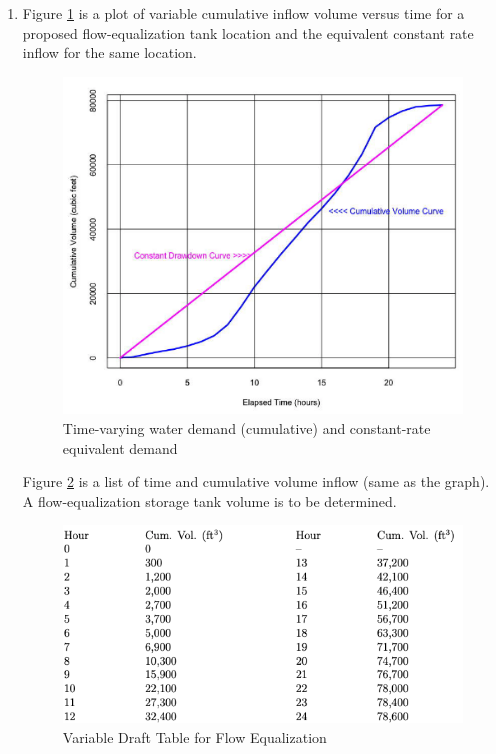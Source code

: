 \documentclass[12pt]{article}
\begin{document}
\begin{enumerate}

\item Figure \ref{fig:DraftCurve} is a plot of variable cumulative inflow volume versus time for a proposed flow-equalization tank location and the equivalent constant rate inflow for the same location. 

\begin{figure}[h!] %
\centering
   \includegraphics[width=5in]{DraftCurve.png}
   \caption{Time-varying water demand (cumulative) and constant-rate equivalent demand }
   \label{fig:DraftCurve} 
\end{figure}

\clearpage

Figure \ref{fig:DraftTable} is a list of time and cumulative volume inflow (same as the graph). A flow-equalization storage tank volume is to be determined.

\begin{figure}[h!] %
\centering
   \includegraphics[width=5in]{DraftTable.png}
   \caption{Variable Draft Table for Flow Equalization }
   \label{fig:DraftTable} 
\end{figure}


\end{enumerate}
\end{document}
